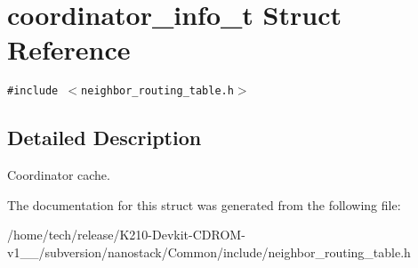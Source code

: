 \hypertarget{structcoordinator__info__t}{
\section{coordinator\_\-info\_\-t Struct Reference}
\label{structcoordinator__info__t}
}
{\tt \#include $<$neighbor\_\-routing\_\-table.h$>$}



\subsection{Detailed Description}
Coordinator cache. 



The documentation for this struct was generated from the following file:\begin{CompactItemize}
\item 
/home/tech/release/K210-Devkit-CDROM-v1\_\_/subversion/nanostack/Common/include/neighbor\_\-routing\_\-table.h\end{CompactItemize}
